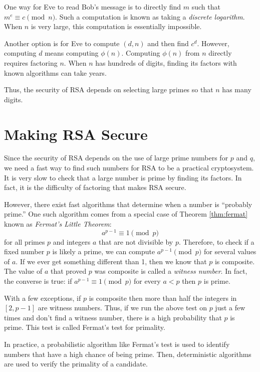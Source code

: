 One way for Eve to read Bob's message is to directly find $m$ such that $m^e \equiv c \pmod{n}$.
Such a computation is known as taking a \emph{discrete logarithm}.
When $n$ is very large, this computation is essentially impossible.

Another option is for Eve to compute $(d, n)$ and then find $c^d$.
However, computing $d$ means computing $\phi(n)$.
Computing $\phi(n)$ from $n$ directly requires factoring $n$.
When $n$ has hundreds of digits, finding its factors with known algorithms can take years.

Thus, the security of RSA depends on selecting large primes so that $n$ has many digits.

\section*{Making RSA Secure}

Since the security of RSA depends on the use of large prime numbers for $p$ and $q$, we need a fast way to find such numbers for RSA to be a practical cryptosystem.
It is very slow to check that a large number is prime by finding its factors.
In fact, it is the difficulty of factoring that makes RSA secure.

However, there exist fast algorithms that determine when a number is ``probably prime.''
One such algorithm comes from a special case of Theorem \ref{thm:fermat} known as \emph{Fermat's Little Theorem}:
\[
a^{p-1} \equiv 1 \pmod{p}
\]
for all primes $p$ and integers $a$ that are not divisible by $p$.
Therefore, to check if a fixed number $p$ is likely a prime, we can compute $a^{p-1} \pmod{p}$ for several values of $a$.
If we ever get something different than 1, then we know that $p$ is composite.
The value of $a$ that proved $p$ was composite is called a \emph{witness number}.
In fact, the converse is true: if $a^{p-1} \equiv 1 \pmod{p}$ for every $a<p$ then $p$ is prime.

With a few exceptions, if $p$ is composite then more than half the integers in $[2, p-1]$ are witness numbers.
Thus, if we run the above test on $p$ just a few times and don't find a witness number, there is a high probability that $p$ is prime.
This test is called Fermat's test for primality.

In practice, a probabilistic algorithm like Fermat's test is used to identify numbers that have a high chance of being prime. 
Then, deterministic algorithms are used to verify the primality of a candidate.

